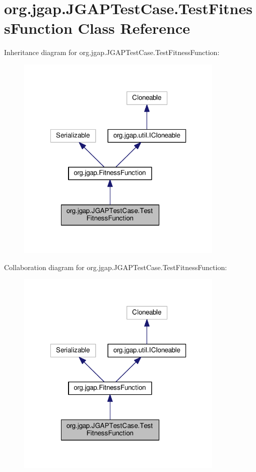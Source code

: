 \hypertarget{classorg_1_1jgap_1_1_j_g_a_p_test_case_1_1_test_fitness_function}{\section{org.\-jgap.\-J\-G\-A\-P\-Test\-Case.\-Test\-Fitness\-Function Class Reference}
\label{classorg_1_1jgap_1_1_j_g_a_p_test_case_1_1_test_fitness_function}
}


Inheritance diagram for org.\-jgap.\-J\-G\-A\-P\-Test\-Case.\-Test\-Fitness\-Function\-:
\nopagebreak
\begin{figure}[H]
\begin{center}
\leavevmode
\includegraphics[width=280pt]{classorg_1_1jgap_1_1_j_g_a_p_test_case_1_1_test_fitness_function__inherit__graph}
\end{center}
\end{figure}


Collaboration diagram for org.\-jgap.\-J\-G\-A\-P\-Test\-Case.\-Test\-Fitness\-Function\-:
\nopagebreak
\begin{figure}[H]
\begin{center}
\leavevmode
\includegraphics[width=280pt]{classorg_1_1jgap_1_1_j_g_a_p_test_case_1_1_test_fitness_function__coll__graph}
\end{center}
\end{figure}
